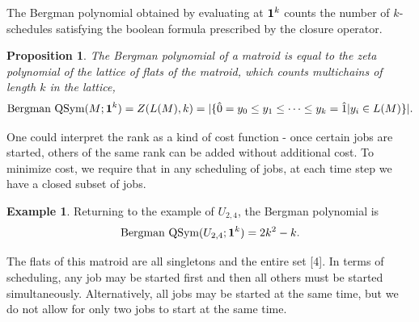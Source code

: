 \documentclass[12pt,reqno]{amsart}
\numberwithin{definition}{section}
\newtheorem{proposition}[definition]{Proposition}
\theoremstyle{definition}
\newtheorem{example}[definition]{Example}
\newcommand{\comment}[1]{\textsf{\footnotesize #1}}
\begin{document}






The Bergman polynomial obtained
by evaluating at ${\bf 1}^k$ counts the number of
$k$-schedules satisfying the boolean formula prescribed by the closure
operator. 

\begin{proposition}
The Bergman polynomial of a matroid is equal to the zeta polynomial of the lattice of flats of the matroid, which counts multichains of length $k$ in the lattice,
$$\textrm{Bergman QSym}(M;{\bf 1}^k) = Z(L(M),k) = |\{ \hat{0} = y_0 \leq y_1 \leq \cdots \leq y_k = \hat{1} | y_i \in L(M) \}|.$$

\end{proposition}

 One could interpret the rank as a kind of cost function -
once certain jobs are started, others of the same rank can be added
without additional cost.  To minimize cost, we require that in any
scheduling of jobs, at each time step we have a closed subset of jobs.

\begin{example}
Returning to the example of $U_{2,4}$, the Bergman polynomial is
$$\textrm{Bergman QSym}(U_{2,4};{\bf 1}^k) = 2k^2 - k.$$

The flats of this matroid are all singletons and the entire set [4].  In terms of scheduling, any job may be started first and then all others must be started simultaneously.  Alternatively, all jobs may be started at the same time, but we do not allow for only two jobs to start at the same time. 
\end{example}






\end{document}
